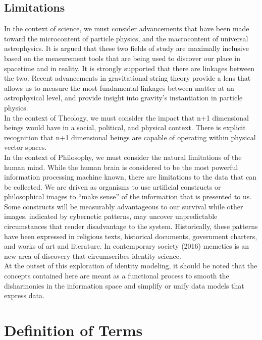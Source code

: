 \documentclass{article}
\begin{document}
\subsection{Limitations}
In the context of science, we must consider advancements that have been made toward the microcontent of particle physics, and the macrocontent of universal astrophysics.  It is argued that these two fields of study are maximally inclusive based on the measurement tools that are being used to discover our place in spacetime and in reality.  It is strongly supported that there are linkages between the two.  Recent advancements in gravitational string theory provide a lens that allows us to measure the most fundamental linkages between matter at an astrophysical level, and provide insight into gravity’s instantiation in particle physics.\\
In the context of Theology, we must consider the impact that n+1 dimensional beings would have in a social, political, and physical context.  There is explicit recognition that n+1 dimensional beings are capable of operating within physical vector spaces.\\ 
In the context of Philosophy, we must consider the natural limitations of the human mind.  While the human brain is considered to be the most powerful information processing machine known, there are limitations to the data that can be collected.  We are driven as organisms to use artificial constructs or philosophical images to “make sense” of the information that is presented to us. Some constructs will be measurably advantageous to our survival while other images, indicated by cybernetic patterns, may uncover unpredictable circumstances that render disadvantage to the system.  Historically, these patterns have been expressed in religious texts, historical documents, government charters, and works of art and literature.  In contemporary society (2016) memetics is an new area of discovery that circumscribes identity science.\\
At the outset of this exploration of identity modeling, it should be noted that the concepts contained here are meant as a functional process to smooth the disharmonies in the information space and simplify or unify data models that express data. 

\section{Definition of Terms}
\end{document}
